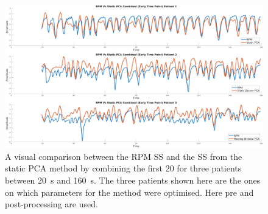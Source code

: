             \begin{figure}
                \centering
                
                \includegraphics[width=1.0\linewidth]{figures/data_driven_surrogate_signal_extraction_results_1_combined_surrogate_signal_processed.png}
                
                \captionsetup{singlelinecheck=false, justification=centering}
                \caption{A visual comparison between the \gls{RPM} \gls{SS} and the \gls{SS} from the static \gls{PCA} method by combining the first $20$  for three patients between \SI{20}{\second} and \SI{160}{\second}. The three patients shown here are the ones on which parameters for the method were optimised. Here pre and post-processing are used.}
                \label{fig:pca_data_driven_surrogate_signal_extraction_methods_for_dynamic_pet_results_combined_surrogate_signal_processed}
            \end{figure}
            
